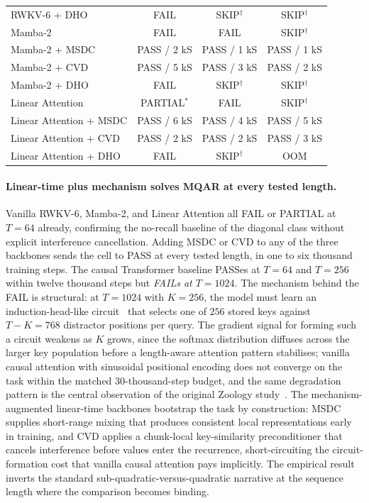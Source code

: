 \begin{table}[!htbp]
\begin{tabularx}{\linewidth}{@{}X c c c@{}}
RWKV-6 + DHO             & FAIL          & SKIP$^{\dagger}$ & SKIP$^{\dagger}$ \\
\addlinespace
Mamba-2                  & FAIL          & FAIL          & SKIP$^{\dagger}$ \\
Mamba-2 + MSDC           & PASS / 2 kS  & PASS / 1 kS  & PASS / 1 kS \\
Mamba-2 + CVD            & PASS / 5 kS  & PASS / 3 kS  & PASS / 2 kS \\
Mamba-2 + DHO            & FAIL          & SKIP$^{\dagger}$ & SKIP$^{\dagger}$ \\
\addlinespace
Linear Attention         & PARTIAL$^{\ast}$ & FAIL          & SKIP$^{\dagger}$ \\
Linear Attention + MSDC  & PASS / 6 kS  & PASS / 4 kS  & PASS / 5 kS \\
Linear Attention + CVD   & PASS / 2 kS  & PASS / 2 kS  & PASS / 3 kS \\
Linear Attention + DHO   & FAIL          & SKIP$^{\dagger}$ & OOM \\
\bottomrule
\end{tabularx}
\end{table}

\paragraph{Linear-time plus mechanism solves MQAR at every
tested length.} Vanilla RWKV-6, Mamba-2, and Linear Attention
all FAIL or PARTIAL at $T = 64$ already, confirming the
no-recall baseline of the diagonal class without explicit
interference cancellation. Adding MSDC or CVD to any of the
three backbones sends the cell to PASS at every tested length,
in one to six thousand training steps. The causal Transformer
baseline PASSes at $T = 64$ and $T = 256$ within twelve
thousand steps but \textit{FAILs at $T = 1024$}. The mechanism
behind the FAIL is structural: at $T = 1024$ with $K = 256$, the
model must learn an induction-head-like
circuit~\cite{olsson2022induction} that selects one of $256$
stored keys against $T - K = 768$ distractor positions per query.
The gradient signal for forming such a circuit weakens as $K$
grows, since the softmax distribution diffuses across the larger
key population before a length-aware attention pattern
stabilises; vanilla causal attention with sinusoidal positional
encoding does not converge on the task within the matched
30-thousand-step budget, and the same degradation pattern is the
central observation of the original Zoology
study~\cite{arora2023zoology}. The mechanism-augmented
linear-time backbones bootstrap the task by construction: MSDC
supplies short-range mixing that produces consistent local
representations early in training, and CVD applies a chunk-local
key-similarity preconditioner that cancels interference before
values enter the recurrence, short-circuiting the
circuit-formation cost that vanilla causal attention pays
implicitly. The empirical result inverts the standard
sub-quadratic-versus-quadratic narrative at the sequence length
where the comparison becomes binding.

